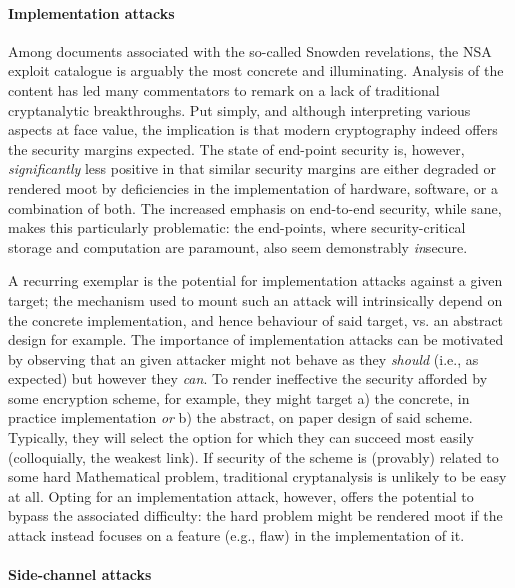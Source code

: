 
\paragraph{Implementation attacks}

Among documents associated with the so-called Snowden revelations, the NSA 
exploit catalogue is arguably the most concrete and illuminating.  Analysis
of the content has led many commentators to remark on a lack of traditional
cryptanalytic breakthroughs.  Put simply, and although interpreting various
aspects at face value, the implication is that modern cryptography indeed
offers the security margins expected.  The state of end-point security is, 
however, {\em significantly} less positive in that similar security margins
are either degraded or rendered moot by deficiencies in the implementation 
of hardware, software, or a combination of both.  The increased emphasis on
end-to-end security, while sane, makes this particularly problematic: the
end-points, where security-critical storage and computation are paramount,
also seem demonstrably {\em in}secure.

A recurring exemplar is the potential for implementation attacks against a
given target; the mechanism used to mount such an attack will intrinsically
depend on the concrete implementation, and hence behaviour of said target,
vs. an abstract design for example.
The importance of implementation attacks can be motivated by observing that
an given attacker might not behave as they {\em should} (i.e., as expected)
but however they {\em can}.  To render ineffective the security afforded by
some encryption scheme, for example, they might target
a) the concrete, in practice implementation
   {\em or}
b) the abstract, on paper    design
of said scheme.  Typically, they will select the option for which they can
succeed most easily (colloquially, the weakest link).  If security of the
scheme is (provably) related to some hard Mathematical problem, traditional
cryptanalysis is unlikely to be easy at all.  Opting for an implementation
attack, however, offers the potential to bypass the associated difficulty:
the hard problem might be rendered moot if the attack instead focuses on a
feature (e.g., flaw) in the implementation of it.


\paragraph{Side-channel   attacks}

